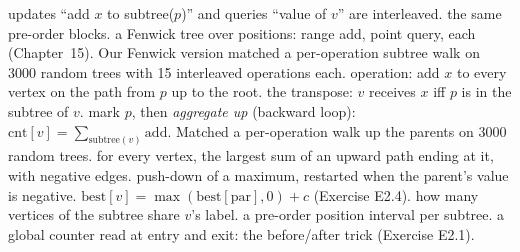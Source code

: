 \begin{variantsbox}
  {updates ``add $x$ to subtree($p$)'' and queries ``value of $v$'' are interleaved.}
  {the same pre-order blocks.}
  {a Fenwick tree over positions: range add, point query,  each (Chapter~15). Our Fenwick version matched a per-operation subtree walk on $3000$ random trees with 15 interleaved operations each.}
  {operation: add $x$ to every vertex on the path from $p$ up to the root.}
  {the transpose: $v$ receives $x$ iff $p$ is in the subtree of $v$.}
  {mark $p$, then \emph{aggregate up} (backward loop): $\mathrm{cnt}[v] = \sum_{\mathrm{subtree}(v)} \mathrm{add}$. Matched a per-operation walk up the parents on $3000$ random trees.}
  {for every vertex, the largest sum of an upward path ending at it, with negative edges.}
  {push-down of a maximum, restarted when the parent's value is negative.}
  {$\mathrm{best}[v] = \max(\mathrm{best}[\mathrm{par}], 0) + c$ (Exercise E2.4).}
  {how many vertices of the subtree share $v$'s label.}
  {a pre-order position interval per subtree.}
  {a global counter read at entry and exit: the before/after trick (Exercise E2.1).}
\end{variantsbox}
